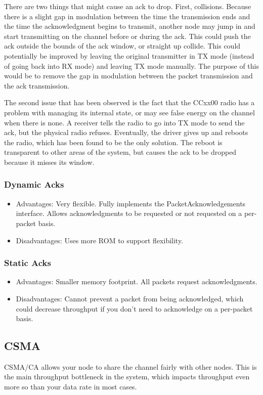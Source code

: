 \documentclass{article}
\begin{document}
There are two things that might cause an ack to drop. First, collisions. Because there is a slight
gap in modulation between the time the transmission ends and the time the acknowledgment begins to 
transmit, another node may jump in and start transmitting on the channel before or during the ack.
This could push the ack outside the bounds of the ack window, or straight up collide. This could 
potentially be improved by leaving the original transmitter in TX mode (instead of going back
into RX mode) and leaving TX mode manually. The purpose of this would be to remove the gap in
modulation between the packet transmission and the ack transmission.

The second issue that has been observed is the fact that the CCxx00 radio has a problem with managing
its internal state, or may see false energy on the channel when there is none. A receiver tells the
radio to go into TX mode to send the ack, but the physical radio refuses. Eventually, the driver 
gives up and reboots the radio, which has been found to be the only solution. The reboot is 
transparent to other areas of the system, but causes the ack to be dropped because it misses its window.

\subsubsection{Dynamic Acks}
\begin{itemize}
  \item Advantages: Very flexible. Fully implements the PacketAcknowledgements interface. 
  Allows acknowledgments to be requested or not requested on a per-packet basis.
  \item Disadvantages: Uses more ROM to support flexibility.
\end{itemize}

\subsubsection{Static Acks}
\begin{itemize}
  \item Advantages: Smaller memory footprint. All packets request acknowledgments.
  \item Disadvantages: Cannot prevent a packet from being acknowledged, which could 
  decrease throughput if you don't need to acknowledge on a per-packet basis.
\end{itemize}

\subsection{CSMA}
\label{sec:csma}
CSMA/CA allows your node to share the channel fairly with other nodes.
This is the main throughput bottleneck in the system, which impacts
throughput even more so than your data rate in most cases. 
\end{document}
